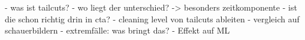 \begin{frame}
    - was ist tailcuts?
    - wo liegt der unterschied? -> besonders zeitkomponente
    - ist die schon richtig drin in cta?
    - cleaning level von tailcuts ableiten
    - vergleich auf schauerbildern
    - extremfälle: was bringt das?
    - Effekt auf ML
\end{frame}